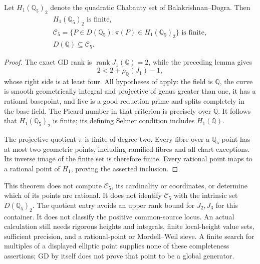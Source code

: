 \begin{theorem}
\label{qh-container}
Let \(H_1(\mathbb Q_5)_2\) denote the quadratic Chabauty set of
Balakrishnan--Dogra. Then
\begin{gather*}
 H_1(\mathbb Q_5)_2\text{ is finite},\\
 \mathcal C_5=\{P\in D(\mathbb Q_5):\pi(P)\in H_1(\mathbb Q_5)_2\}
 \text{ is finite},\\
 D(\mathbb Q)\subseteq\mathcal C_5.
\end{gather*}
\end{theorem}
\begin{proof}
The exact GD rank is \(\operatorname{rank}J_1(\mathbb Q)=2\), while
the preceding lemma gives
\[
 2<2+\rho_{\mathbb Q}(J_1)-1,
\]
whose right side is at least four. All hypotheses of
\cite[Lemma~3.2]{BalakrishnanDograQCI} apply: the field is \(\mathbb Q\),
the curve is smooth geometrically integral and projective of genus
greater than one, it has a rational basepoint, and five is a good
reduction prime and splits completely in the base field. The Picard
number in that criterion is precisely over \(\mathbb Q\).
It follows that \(H_1(\mathbb Q_5)_2\) is finite; its defining Selmer
condition includes \(H_1(\mathbb Q)\).

The projective quotient \(\pi\) is finite of degree two. Every fibre
over a \(\mathbb Q_5\)-point has at most two geometric points, including
ramified fibres and all chart exceptions. Its inverse image of the
finite set is therefore finite. Every rational point maps to a rational
point of \(H_1\), proving the asserted inclusion.
\end{proof}

This theorem does not compute \(\mathcal C_5\), its cardinality or
coordinates, or determine which of its points are rational. It does not
identify \(\mathcal C_5\) with the intrinsic set \(D(\mathbb Q_5)_2\).
The quotient entry avoids an upper rank bound for \(J_2,J_3\) for this
container. It does not classify the positive common-source locus.
An actual calculation still needs rigorous heights and integrals,
finite local-height value sets, sufficient precision, and a rational-point
or Mordell--Weil sieve. A finite search for multiples of a displayed
elliptic point supplies none of these completeness assertions; GD by
itself does not prove that point to be a global generator.

